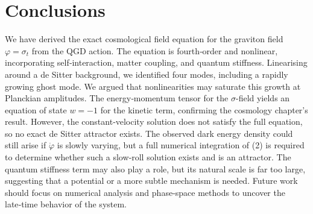 \documentclass[11pt,a4paper]{article}
\begin{document}
\section{Conclusions}
\label{sec:conclusions}

We have derived the exact cosmological field equation for the graviton field \(\varphi = \sigma_t\) from the QGD action. The equation is fourth‑order and nonlinear, incorporating self‑interaction, matter coupling, and quantum stiffness. Linearising around a de Sitter background, we identified four modes, including a rapidly growing ghost mode. We argued that nonlinearities may saturate this growth at Planckian amplitudes. The energy‑momentum tensor for the \(\sigma\)-field yields an equation of state \(w=-1\) for the kinetic term, confirming the cosmology chapter's result. However, the constant‑velocity solution does not satisfy the full equation, so no exact de Sitter attractor exists. The observed dark energy density could still arise if \(\dot\varphi\) is slowly varying, but a full numerical integration of (2) is required to determine whether such a slow‑roll solution exists and is an attractor. The quantum stiffness term may also play a role, but its natural scale is far too large, suggesting that a potential or a more subtle mechanism is needed. Future work should focus on numerical analysis and phase‑space methods to uncover the late‑time behavior of the system.
\end{document}

